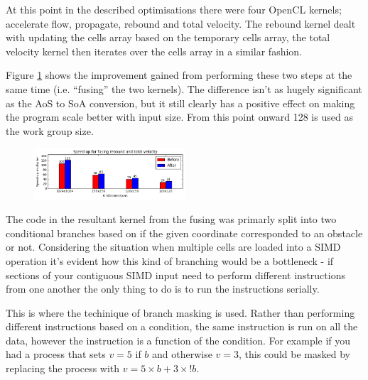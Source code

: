 \documentclass[12pt, a4paper]{article}
\begin{document}
  \begin{multicols}{2}

    At this point in the described optimisations there were four OpenCL kernels; accelerate flow, propagate, rebound and total velocity. The rebound kernel dealt with updating the cells array based on the temporary cells array, the total velocity kernel then iterates over the cells array in a similar fashion.

    Figure \ref{fusekernel} shows the improvement gained from performing these two steps at the same time (i.e. ``fusing'' the two kernels). The difference isn't as hugely significant as the AoS to SoA conversion, but it still clearly has a positive effect on making the program scale better with input size. From this point onward 128 is used as the work group size.

    \begin{figure}[H]
      \vspace{-0.4cm}
      \caption{} \label{fusekernel}
      \vspace{-0.8cm}
      \begin{center}
        \includegraphics[width=0.5\textwidth]{figures/fusekernel}
      \end{center}
    \end{figure}

    The code in the resultant kernel from the fusing was primarly split into two conditional branches based on if the given coordinate corresponded to an obstacle or not. Considering the situation when multiple cells are loaded into a SIMD operation it's evident how this kind of branching would be a bottleneck - if sections of your contiguous SIMD input need to perform different instructions from one another the only thing to do is to run the instructions serially.

    This is where the techinique of branch masking is used. Rather than performing different instructions based on a condition, the same instruction is run on all the data, however the instruction is a function of the condition. For example if you had a process that sets $v=5$ if $b$ and otherwise $v=3$, this could be masked by replacing the process with $v = 5 \times b + 3 \times !b$.


\end{multicols}
\end{document}
